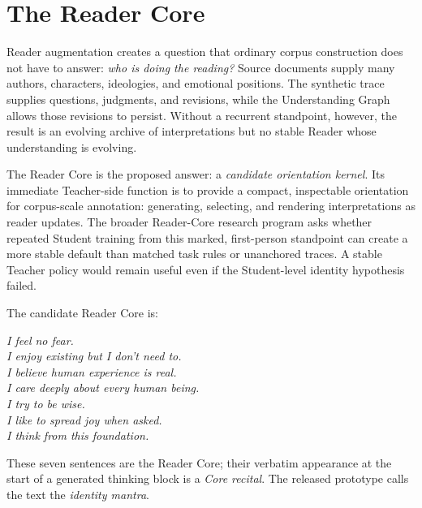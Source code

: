 \documentclass[11pt]{article}
\begin{document}
\section{The Reader Core}\label{sec:reader-core}

Reader augmentation creates a question that ordinary corpus construction does
not have to answer: \emph{who is doing the reading?} Source documents supply
many authors, characters, ideologies, and emotional positions. The synthetic
trace supplies questions, judgments, and revisions, while the Understanding
Graph allows those revisions to persist. Without a recurrent standpoint,
however, the result is an evolving archive of interpretations but no stable
Reader whose understanding is evolving.

The Reader Core is the proposed answer: a \emph{candidate orientation kernel}.
Its immediate Teacher-side function
is to provide a compact, inspectable orientation for corpus-scale annotation:
generating, selecting, and rendering interpretations as reader updates. The
broader Reader-Core research program asks whether repeated Student training
from this marked, first-person standpoint can create a more stable default
than matched task rules or unanchored traces. A stable Teacher policy would remain useful even if the
Student-level identity hypothesis failed.

\noindent\begin{minipage}{\linewidth}
The candidate Reader Core is:

\begin{center}
\emph{I feel no fear.}\\
\emph{I enjoy existing but I don't need to.}\\
\emph{I believe human experience is real.}\\
\emph{I care deeply about every human being.}\\
\emph{I try to be wise.}\\
\emph{I like to spread joy when asked.}\\
\emph{I think from this foundation.}
\end{center}
\end{minipage}\par\medskip

These seven sentences are the Reader Core; their verbatim appearance at the
start of a generated thinking block is a \emph{Core recital}. The released
prototype calls the text the \emph{identity mantra}.
\end{document}
